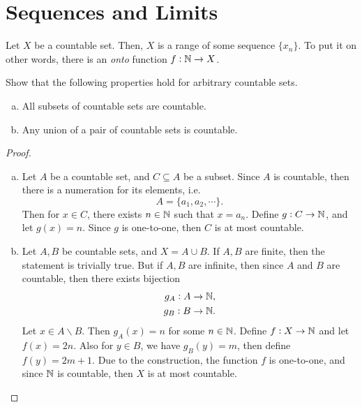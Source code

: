 \chapter{Sequences and Limits}


\begin{proposition}
	Let $X$ be a countable set. Then, $X$ is a range of some sequence $\{x_n\}$. To put it on other words, there is an \emph{onto} function $f: \mathbb{N} \to X$.
\end{proposition}

\begin{problem}
	Show that the following properties hold for arbitrary countable sets.
	\begin{enumerate}[(a)]
		\item All subsets of countable sets are countable.
		\item Any union of a pair of countable sets is countable.

	\end{enumerate}
\end{problem}

\begin{proof}
	~\vspace{2pt}
	\begin{enumerate}[(a)]
		\item Let $A$ be a countable set, and $C \subseteq A$ be a subset. Since $A$ is countable, then there is a numeration for its elements, i.e.
		\[ A = \{ a_1, a_2, \cdots \}. \]
		Then for $x \in C$, there exists $n \in \mathbb{N}$ such that $x = a_n$. Define $g: C \to \mathbb{N}$, and let $g(x) = n$. Since $g$ is one-to-one, then $C$ is at most countable.
		
		\item Let $A, B$ be countable sets, and $X = A \cup B$. If $A, B$ are finite, then the statement is trivially true. But if $A, B$ are infinite, then since $A$ and $B$ are countable, then there exists bijection
		\begin{align*}
			g_A: A \to \mathbb{N}, \\
			g_B: B \to \mathbb{N}.\\
		\end{align*}
		Let $x \in A \backslash B$. Then $g_A(x) = n$ for some $n \in \mathbb{N}$. Define $f: X \to \mathbb{N}$ and let $f(x) = 2n$. Also for $y \in B$, we have $g_B(y) = m$, then define $f(y) = 2m+1$. Due to the construction, the function $f$ is one-to-one, and since $\mathbb{N}$ is countable, then $X$ is at most countable.

	\end{enumerate}
\end{proof}


